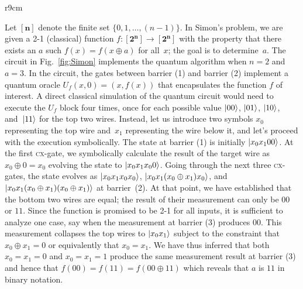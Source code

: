 \documentclass{article}
\newcommand{\cx}{\textsc{cx}}
\newcommand{\finset}[1]{[\mathbf{#1}]}
\begin{document}
\begin{wrapfigure}{r}{9cm}
\caption{\label{fig:Simon}Circuit for Simon's Algorithm $n=2$ and $a=3$}
\end{wrapfigure}
Let $\finset{n}$ denote the finite set $\{ 0,1,\ldots,(n-1)\}$. In
Simon's problem, we are given a 2-1 (classical) function $f :
\finset{2^n} \rightarrow \finset{2^n}$ with the property that there
exists an $a$ such $f(x) = f(x \oplus a)$ for all~$x$; the goal is to
determine~$a$. The circuit in Fig.~\ref{fig:Simon} implements the
quantum algorithm when $n=2$ and $a = 3$. In the circuit, the gates
between barrier (1) and barrier (2) implement a quantum oracle
$U_f(x,0) = (x,f(x))$ that encapsulates the function $f$ of
interest. A direct classical simulation of the quantum circuit would
need to execute the $U_f$ block four times, once for each possible value
$\ket{00}$, $\ket{01}$, $\ket{10}$, and~$\ket{11}$ for the top two
wires. Instead, let us introduce two symbols $x_0$ representing the
top wire and~$x_1$ representing the wire below it, and let's proceed
with the execution symbolically. The state at barrier (1) is initially
$\ket{x_0x_100}$. At the first \cx-gate, we symbolically calculate the
result of the target wire as $x_0 \oplus 0 = x_0$ evolving the state
to $\ket{x_0x_1x_00}$. Going through the next three \cx-gates, the
state evolves as $\ket{x_0x_1x_0x_0}$, $\ket{x_0x_1(x_0\oplus
  x_1)x_0}$, and $\ket{x_0x_1(x_0\oplus x_1)(x_0\oplus x_1)}$ at
barrier~(2). At that point, we have established that the bottom two
wires are equal; the result of their measurement can only be $00$ or
$11$. Since the function is promised to be 2-1 for all inputs, it is
sufficient to analyze one case, say when the measurement at barrier
(3) produces $00$. This measurement collapses the top wires to
$\ket{x_0x_1}$ subject to the constraint that $x_0\oplus x_1 = 0$ or
equivalently that $x_0 = x_1$.  We have thus inferred that both
$x_0=x_1=0$ and $x_0=x_1=1$ produce the same measurement result at
barrier (3) and hence that $f(00) = f(11) = f(00 \oplus 11)$ which
reveals that $a$ is $11$ in binary notation.
\end{document}
